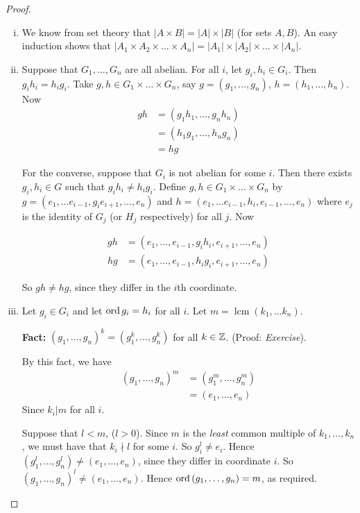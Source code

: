 \documentclass{article}
\theoremstyle{definition} \newtheorem*{definition}{Definition}
\DeclareMathOperator{\lcm}{lcm} \DeclareMathOperator{\hcf}{hcf}
\begin{document}
\begin{proof}\hfill \begin{enumerate}[(i)] \item We know from set theory that $|A
          \times B| = |A| \times |B|$ (for sets $A,B$). An easy induction shows
          that $|A_1 \times A_2 \times \dots \times A_n| = |A_1| \times |A_2|
          \times \dots \times |A_n|$.  \item Suppose that $G_1, \dots , G_n$
            are all abelian. For all $i$, let $g_i,h_i\in G_i$. Then
            $g_ih_i=h_ig_i$. Take $g,h \in G_1 \times \dots \times G_n$, say
            $g=\left( g_1, \dots , g_n \right)$, $h = \left( h_1, \dots , h_n
            \right)$. Now \begin{align*} gh &= \left( g_1 h_1, \dots , g_n h_n
              \right)\\ &= \left( h_1g_1, \dots , h_n g_n \right)\\ &= hg
            \end{align*}

For the converse, suppose that $G_i$ is not abelian for some $i$. Then there
exists $g_i,h_i \in G$ such that $g_ih_i \neq h_ig_i$. Define $g,h \in G_1
\times \dots \times G_n$ by $g = \left( e_1,\dots e_{i-1},g_ie_{i+1},\dots,e_n
\right)$ and $h = \left( e_1, \dots e_{i-1},h_i,e_{i-1},\dots,e_n \right)$
where $e_j$ is the identity of $G_j$ (or $H_j$ respectively) for all $j$. Now

\begin{align*} gh &= \left( e_1,\dots,e_{i-1},g_ih_i,e_{i+1},\dots,e_n
  \right)\\ hg &= \left( e_1,\dots,e_{i-1},h_ig_i,e_{i+1},\dots,e_n \right)
\end{align*}

So $gh \neq hg$, since they differ in the $i$th coordinate.

\item Let $g_i \in G_i$ and let $\operatorname{\text{ord}} g_i=h_i$ for all $i$. Let
  $m=\lcm(k_1,\dots k_n)$.

  \textbf{Fact:} $(g_1, \dots ,g_n)^{k}=(g_1^k,\dots,g_n^k)$ for all $k \in
  \mathbb{Z}$. (Proof: \emph{Exercise}).

  By this fact, we have \begin{align*} \left( g_1, \dots, g_n \right)^m &=
    \left( g_1^m, \dots,g_n^m \right)\\ &= \left( e_1, \dots,e_n \right)
  \end{align*} Since $k_i | m$ for all $i$.

  Suppose that $l<m$, ($l>0$). Since $m$ is the \emph{least} common multiple of
  $k_1, \dots, k_n$, we must have that $k_i\nmid l$ for some $i$. So $g_i^l\neq
  e_i$. Hence $\left( g_1^l,\dots,g_n^l \right) \neq \left( e_1,\dots,e_n
  \right)$, since they differ in coordinate $i$. So $\left( g_1 ,\dots,g_n
  \right)^l \neq \left( e_1, \dots,e_n \right)$. Hence $\operatorname{\text{ord}} \left( g_1
  ,\dots,g_n \right)=m$, as required.  \end{enumerate} \end{proof}
\end{document}
